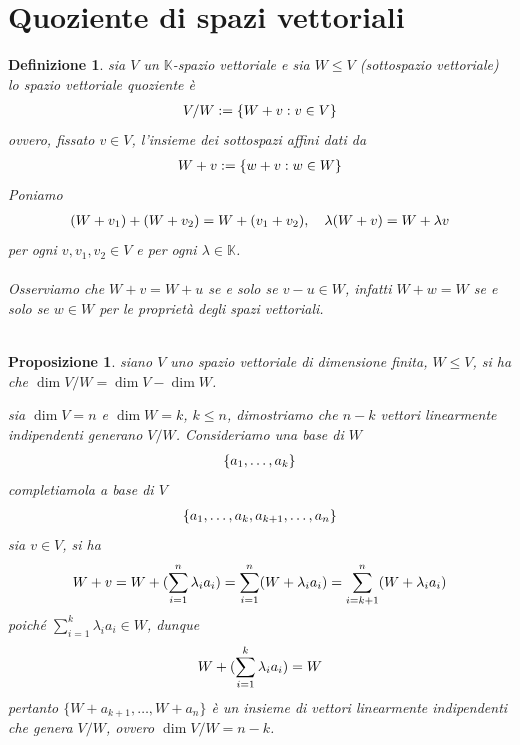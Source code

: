 \documentclass[oneside, 11pt]{amsbook}
\makeatletter
\newcommand{\0}{{(0)}}
\newcommand{\3}{{(3)}}
\theoremstyle{colonplain}
\newtheorem{prop}[thm]{Proposizione}
\theoremstyle{colondefinition}
\newtheorem{defn}[thm]{Definizione}
\theoremstyle{colonremark}
\numberwithin{equation}{chapter}
\renewcommand{\proofname}{Dimostrazione}
\renewenvironment{proof}[1][\proofname]{\par
  \pushQED{\qed}%
  \normalfont \topsep6\p@\@plus6\p@\relax
  \trivlist
  \item[\hskip\labelsep\bfseries #1:]\ignorespaces
}{%
  \popQED\endtrivlist\@endpefalse
}
\makeatother
\begin{document}
\section{Quoziente di spazi vettoriali}
\begin{defn} sia $V$ un $\mathbb{K}$-spazio vettoriale e sia $W \leq V$ (sottospazio vettoriale) lo \textit{spazio vettoriale quoziente} è
\begin{align}
    V/W := \{ W + v : v \in V \} \notag
\end{align}
ovvero, fissato $v \in V$, l'insieme dei sottospazi affini dati da
\begin{align}
    W + v := \{ w + v : w \in W \} \notag
\end{align}
Poniamo
\begin{align}
    (W + v_1) + (W + v_2) = W + (v_1 + v_2), \quad \lambda(W + v) = W + \lambda v \notag
\end{align}
per ogni $v, v_1, v_2 \in V$ e per ogni $\lambda \in \mathbb{K}$. \\ \\
Osserviamo che $W + v = W + u$ se e solo se $v - u \in W$, infatti $W + w = W$ se e solo se $w \in W$ per le proprietà degli spazi vettoriali. \\ \\
\end{defn}
\begin{prop} siano $V$ uno spazio vettoriale di dimensione finita, $W \leq V$, si ha che $\dim V/W = \dim V - \dim W$. \\

\begin{proof} sia $\dim V = n$ e $\dim W = k$, $k \leq n$, dimostriamo che $n - k$ vettori linearmente indipendenti generano $V/W$. Consideriamo una base di $W$
\begin{align}
    \{ a_1, \dots, a_k \} \notag
\end{align}
completiamola a base di $V$
\begin{align}
    \{ a_1, \dots, a_k, a_{k + 1}, \dots, a_n \} \notag
\end{align}
sia $v \in V$, si ha
\begin{align}
    W + v = W + (\sum_{i = 1}^n \lambda_i a_i) = \sum_{i = 1}^n (W + \lambda_i a_i) = \sum_{i = k + 1}^n (W + \lambda_ia_i) \notag 
\end{align}
poiché $\sum_{i = 1}^k \lambda_i a_i \in W$, dunque
\begin{align}
    W + (\sum_{i = 1}^k \lambda_i a_i) = W \notag
\end{align}
pertanto $\{ W + a_{k + 1}, \dots, W + a_n \}$ è un insieme di vettori linearmente indipendenti che genera $V/W$, ovvero $\dim V/W = n - k$. \end{proof}
\end{prop}
\end{document}
